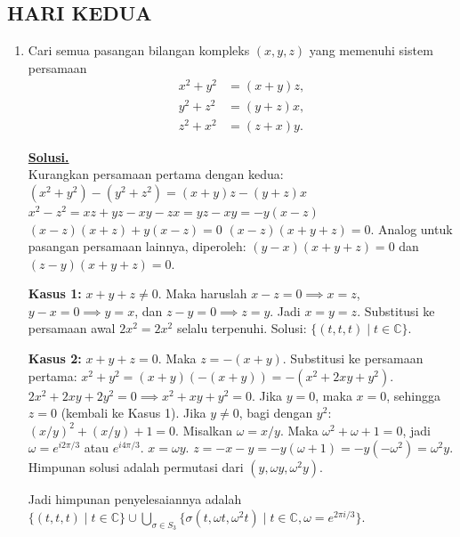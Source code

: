 \documentclass[12pt,twoside]{article}
\newenvironment{solution}
{
	\par\noindent\textbf{\underline{Solusi.}}\\
}
{
	\par
}
\begin{document}
\subsection{HARI KEDUA}
\begin{enumerate}
  \item Cari semua pasangan bilangan kompleks $(x, y, z)$ yang memenuhi sistem persamaan
        \[
          \begin{aligned}
            x^2 + y^2 & = (x + y)z, \\
            y^2 + z^2 & = (y + z)x, \\
            z^2 + x^2 & = (z + x)y.
          \end{aligned}
        \]
        \begin{solution}
          Kurangkan persamaan pertama dengan kedua:
          $(x^2+y^2) - (y^2+z^2) = (x+y)z - (y+z)x$
          $x^2-z^2 = xz+yz-xy-zx = yz-xy = -y(x-z)$
          $(x-z)(x+z) + y(x-z) = 0$
          $(x-z)(x+y+z) = 0$.
          Analog untuk pasangan persamaan lainnya, diperoleh:
          $(y-x)(x+y+z) = 0$ dan $(z-y)(x+y+z) = 0$.

          \textbf{Kasus 1:} $x+y+z \ne 0$.
          Maka haruslah $x-z=0 \implies x=z$, $y-x=0 \implies y=x$, dan $z-y=0 \implies z=y$.
          Jadi $x=y=z$. Substitusi ke persamaan awal $2x^2 = 2x^2$ selalu terpenuhi.
          Solusi: $\{(t,t,t) \mid t \in \mathbb{C}\}$.

          \textbf{Kasus 2:} $x+y+z = 0$.
          Maka $z = -(x+y)$. Substitusi ke persamaan pertama:
          $x^2+y^2 = (x+y)(-(x+y)) = -(x^2+2xy+y^2)$.
          $2x^2 + 2xy + 2y^2 = 0 \implies x^2+xy+y^2 = 0$.
          Jika $y=0$, maka $x=0$, sehingga $z=0$ (kembali ke Kasus 1).
          Jika $y \ne 0$, bagi dengan $y^2$: $(x/y)^2 + (x/y) + 1 = 0$.
          Misalkan $\omega = x/y$. Maka $\omega^2+\omega+1=0$, jadi $\omega = e^{i 2\pi/3}$ atau $e^{i 4\pi/3}$.
          $x = \omega y$.
          $z = -x-y = -y(\omega+1) = -y(-\omega^2) = \omega^2 y$.
          Himpunan solusi adalah permutasi dari $(y, \omega y, \omega^2 y)$.

          Jadi himpunan penyelesaiannya adalah
          $\{(t,t,t) \mid t \in \mathbb{C}\} \cup \bigcup_{\sigma \in S_3} \{\sigma(t, \omega t, \omega^2 t) \mid t \in \mathbb{C}, \omega = e^{2\pi i/3}\}$.
        \end{solution}


\end{enumerate}
\end{document}
